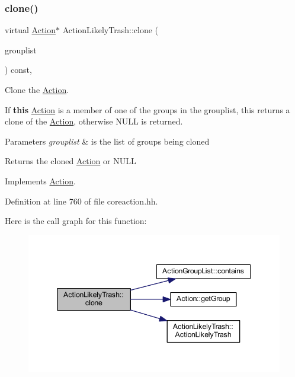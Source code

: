\subsubsection{\texorpdfstring{clone()}{clone()}}
{\footnotesize\ttfamily virtual \mbox{\hyperlink{class_action}{Action}}$\ast$ Action\+Likely\+Trash\+::clone (\begin{DoxyParamCaption}\item[{const \mbox{\hyperlink{class_action_group_list}{Action\+Group\+List}} \&}]{grouplist }\end{DoxyParamCaption}) const\hspace{0.3cm}{\ttfamily [inline]}, {\ttfamily [virtual]}}



Clone the \mbox{\hyperlink{class_action}{Action}}. 

If {\bfseries{this}} \mbox{\hyperlink{class_action}{Action}} is a member of one of the groups in the grouplist, this returns a clone of the \mbox{\hyperlink{class_action}{Action}}, otherwise N\+U\+LL is returned. 
\begin{DoxyParams}{Parameters}
{\em grouplist} & is the list of groups being cloned \\
\hline
\end{DoxyParams}
\begin{DoxyReturn}{Returns}
the cloned \mbox{\hyperlink{class_action}{Action}} or N\+U\+LL 
\end{DoxyReturn}


Implements \mbox{\hyperlink{class_action_af8242e41d09e5df52f97df9e65cc626f}{Action}}.



Definition at line 760 of file coreaction.\+hh.

Here is the call graph for this function\+:
\nopagebreak
\begin{figure}[H]
\begin{center}
\leavevmode
\includegraphics[width=345pt]{class_action_likely_trash_ad0d1990ca8b2b48d5d88d757b3664560_cgraph}
\end{center}
\end{figure}


